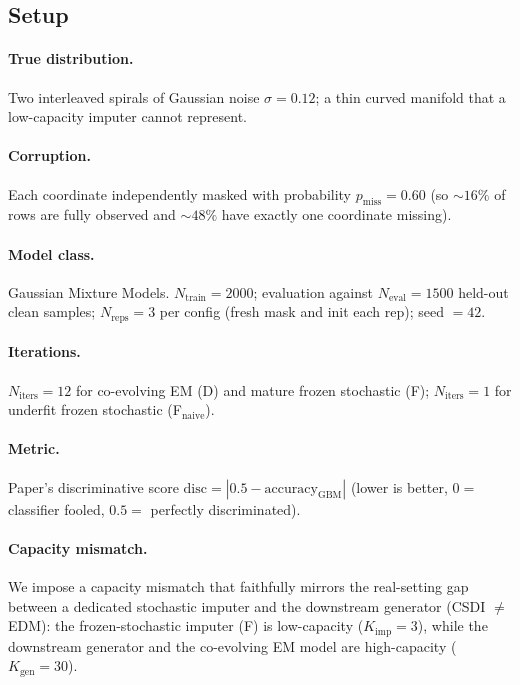\documentclass{article}
\theoremstyle{plain}
\theoremstyle{definition}
\theoremstyle{remark}
\begin{document}
\subsection{Setup}
\label{app:toy-setup}

\paragraph{True distribution.}
Two interleaved spirals of Gaussian noise $\sigma = 0.12$; a thin curved manifold that a low-capacity imputer cannot represent.

\paragraph{Corruption.}
Each coordinate independently masked with probability $p_{\mathrm{miss}} = 0.60$ (so ${\sim}16\%$ of rows are fully observed and ${\sim}48\%$ have exactly one coordinate missing).

\paragraph{Model class.}
Gaussian Mixture Models. $N_{\mathrm{train}} = 2000$; evaluation against $N_{\mathrm{eval}} = 1500$ held-out clean samples; $N_{\mathrm{reps}} = 3$ per config (fresh mask and init each rep); seed $= 42$.

\paragraph{Iterations.}
$N_{\mathrm{iters}} = 12$ for co-evolving EM (D) and mature frozen stochastic (F); $N_{\mathrm{iters}} = 1$ for underfit frozen stochastic (F$_{\mathrm{naive}}$).

\paragraph{Metric.}
Paper's discriminative score $\mathrm{disc} = |0.5 - \mathrm{accuracy}_{\mathrm{GBM}}|$ (lower is better, $0 =$ classifier fooled, $0.5 =$ perfectly discriminated).

\paragraph{Capacity mismatch.}
We impose a capacity mismatch that faithfully mirrors the real-setting gap between a dedicated stochastic imputer and the downstream generator (CSDI $\neq$ EDM): the frozen-stochastic imputer (F) is low-capacity ($K_{\mathrm{imp}} = 3$), while the downstream generator and the co-evolving EM model are high-capacity ($K_{\mathrm{gen}} = 30$).
\end{document}
